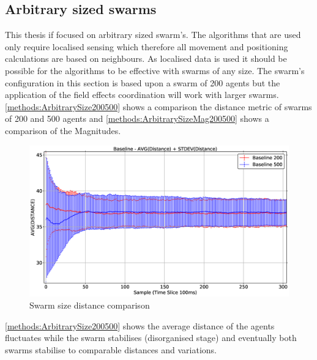 \subsection{Arbitrary sized swarms}\label{section:arbitrary}
This thesis if focused on arbitrary sized swarm's. The algorithms that are used only require localised sensing which therefore all movement and positioning calculations are based on neighbours. As localised data is used it should be possible for the algorithms to be effective with swarms of any size. The swarm's configuration in this section is based upon a swarm of 200 agents but the application of the field effects coordination will work with larger swarms. \autoref{methods:ArbitrarySize200500} shows a comparison the distance metric of swarms of 200 and 500 agents and \autoref{methods:ArbitrarySizeMag200500} shows a comparison of the Magnitudes.

\begin{figure}[H]
\begin{center}
\includegraphics[width=13cm]{CHAPTER-5/figures/ArbitrarySize200500}
\end{center}
\caption{Swarm size distance comparison\label{methods:ArbitrarySize200500}}
\end{figure}

\autoref{methods:ArbitrarySize200500} shows the average distance of the agents fluctuates while the swarm stabilises (disorganised stage) and eventually both swarms stabilise to comparable distances and variations. 

